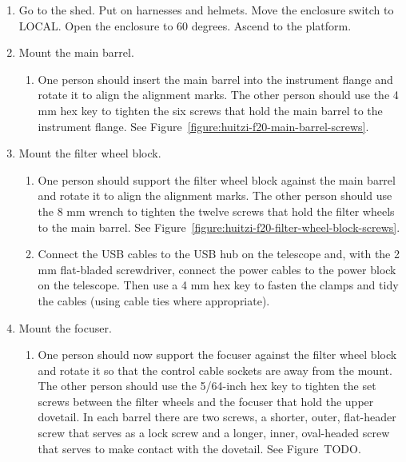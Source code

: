 \begin{enumerate}

\item Go to the shed. Put on harnesses and helmets. Move the enclosure switch to LOCAL. Open the enclosure to 60 degrees. Ascend to the platform.
    
\item Mount the main barrel.

\begin{enumerate}
    
  \item One person should insert the main barrel into the instrument flange and rotate it to align the alignment marks. The other person should use the 4 mm hex key to tighten the six screws that hold the main barrel to the instrument flange. See Figure~\ref{figure:huitzi-f20-main-barrel-screws}.

\end{enumerate}

\item Mount the filter wheel block.

\begin{enumerate}
    
  \item One person should support the filter wheel block against the main barrel and rotate it to align the alignment marks. The other person should use the 8 mm wrench to tighten the twelve screws that hold the filter wheels to the main barrel. See Figure~\ref{figure:huitzi-f20-filter-wheel-block-screws}.

   \item Connect the USB cables to the USB hub on the telescope and, with the 2 mm flat-bladed screwdriver, connect the power cables to the power block on the telescope. Then use a 4 mm hex key to fasten the clamps and tidy the cables (using cable ties where appropriate).
  
\end{enumerate}

\item Mount the focuser.

\begin{enumerate}
  
  \item One person should now support the focuser against the filter wheel block and rotate it so that the control cable sockets are away from the mount.
  The other person should use the 5/64-inch hex key to tighten the set screws between the filter wheels and the focuser that hold the upper dovetail. In each barrel there are two screws, a shorter, outer, flat-header screw that serves as a lock screw and a longer, inner, oval-headed screw that serves to make contact with the dovetail. See Figure~TODO.


\end{enumerate}
\end{enumerate}
